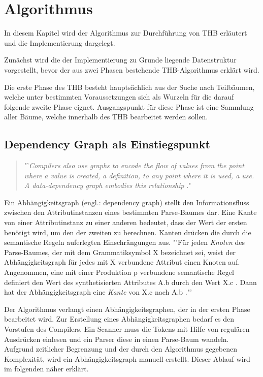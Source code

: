 \chapter{Algorithmus}
In diesem Kapitel wird der Algorithmus zur Durchführung von \ac{THB} erläutert und die Implementierung dargelegt. 

Zunächst wird die der Implementierung zu Grunde liegende Datenstruktur vorgestellt, bevor der aus zwei Phasen bestehende \ac{THB}-Algorithmus erklärt wird.

Die erste Phase des \ac{THB} besteht hauptsächlich aus der Suche nach Teilbäumen, welche unter bestimmten Voraussetzungen sich als Wurzeln für die darauf folgende zweite Phase eignet. Ausgangspunkt für diese Phase ist eine Sammlung aller Bäume, welche innerhalb des \ac{THB} bearbeitet werden sollen. 



\section{Dependency Graph als Einstiegspunkt}

\begin{quotation}
	"'\textit{Compilers also use graphs to encode the flow of values from the point where a value is created, a definition, to any point where it is used, a use. A data-dependency graph embodies this relationship} \cite{HeBIS-309344573}." 
\end{quotation}

Ein Abhängigkeitsgraph (engl.: dependency graph) stellt den Informationsfluss zwischen den Attributinstanzen eines bestimmten Parse-Baumes dar. Eine Kante von einer Attributinstanz zu einer anderen bedeutet, dass der Wert der ersten benötigt wird, um den der zweiten zu berechnen. Kanten drücken die durch die semantische Regeln auferlegten Einschrängungen aus. "'Für jeden \textit{Knoten} des Parse-Baumes, der mit dem Grammatiksymbol X bezeichnet sei, weist der Abhängigkeitsgraph für jedes mit X verbundene Attribut einen Knoten auf. Angenommen, eine mit einer Produktion p verbundene semantische Regel definiert den Wert des synthetisierten Attributes A.b durch den Wert X.c . Dann hat der Abhängigkeitsgraph eine \textit{Kante} von X.c nach A.b \cite{HeBIS-194410269}."' 

Der Algorithmus verlangt einen Abhängigkeitsgraphen, der in der ersten Phase bearbeitet wird. Zur Erstellung eines Abhängigkeitsgraphen bedarf es den Vorstufen des Compilers. Ein Scanner muss die Tokens mit Hilfe von regulären Ausdrücken einlesen und ein Parser diese in einen Parse-Baum wandeln. Aufgrund zeitlicher Begrenzung und der durch den Algorithmus gegebenen Komplexität, wird ein Abhängigkeitsgraph manuell erstellt. Dieser Ablauf wird im folgenden näher erklärt.


